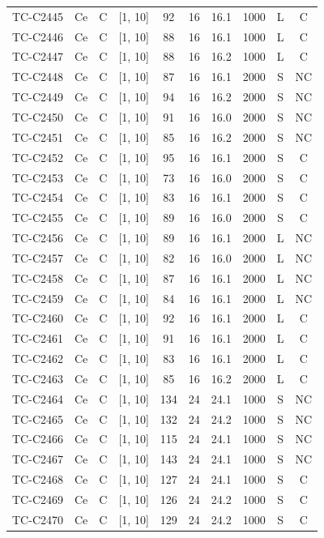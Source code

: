 \begin{longtable}{lccccccccc}
TC-C2445 & Ce & C & [1, 10] & 92 & 16 & 16.1 & 1000 & L & C \\
TC-C2446 & Ce & C & [1, 10] & 88 & 16 & 16.1 & 1000 & L & C \\
TC-C2447 & Ce & C & [1, 10] & 88 & 16 & 16.2 & 1000 & L & C \\
TC-C2448 & Ce & C & [1, 10] & 87 & 16 & 16.1 & 2000 & S & NC \\
TC-C2449 & Ce & C & [1, 10] & 94 & 16 & 16.2 & 2000 & S & NC \\
TC-C2450 & Ce & C & [1, 10] & 91 & 16 & 16.0 & 2000 & S & NC \\
TC-C2451 & Ce & C & [1, 10] & 85 & 16 & 16.2 & 2000 & S & NC \\
TC-C2452 & Ce & C & [1, 10] & 95 & 16 & 16.1 & 2000 & S & C \\
TC-C2453 & Ce & C & [1, 10] & 73 & 16 & 16.0 & 2000 & S & C \\
TC-C2454 & Ce & C & [1, 10] & 83 & 16 & 16.1 & 2000 & S & C \\
TC-C2455 & Ce & C & [1, 10] & 89 & 16 & 16.0 & 2000 & S & C \\
TC-C2456 & Ce & C & [1, 10] & 89 & 16 & 16.1 & 2000 & L & NC \\
TC-C2457 & Ce & C & [1, 10] & 82 & 16 & 16.0 & 2000 & L & NC \\
TC-C2458 & Ce & C & [1, 10] & 87 & 16 & 16.1 & 2000 & L & NC \\
TC-C2459 & Ce & C & [1, 10] & 84 & 16 & 16.1 & 2000 & L & NC \\
TC-C2460 & Ce & C & [1, 10] & 92 & 16 & 16.1 & 2000 & L & C \\
TC-C2461 & Ce & C & [1, 10] & 91 & 16 & 16.1 & 2000 & L & C \\
TC-C2462 & Ce & C & [1, 10] & 83 & 16 & 16.1 & 2000 & L & C \\
TC-C2463 & Ce & C & [1, 10] & 85 & 16 & 16.2 & 2000 & L & C \\
TC-C2464 & Ce & C & [1, 10] & 134 & 24 & 24.1 & 1000 & S & NC \\
TC-C2465 & Ce & C & [1, 10] & 132 & 24 & 24.2 & 1000 & S & NC \\
TC-C2466 & Ce & C & [1, 10] & 115 & 24 & 24.1 & 1000 & S & NC \\
TC-C2467 & Ce & C & [1, 10] & 143 & 24 & 24.1 & 1000 & S & NC \\
TC-C2468 & Ce & C & [1, 10] & 127 & 24 & 24.1 & 1000 & S & C \\
TC-C2469 & Ce & C & [1, 10] & 126 & 24 & 24.2 & 1000 & S & C \\
TC-C2470 & Ce & C & [1, 10] & 129 & 24 & 24.2 & 1000 & S & C \\

\end{longtable}
